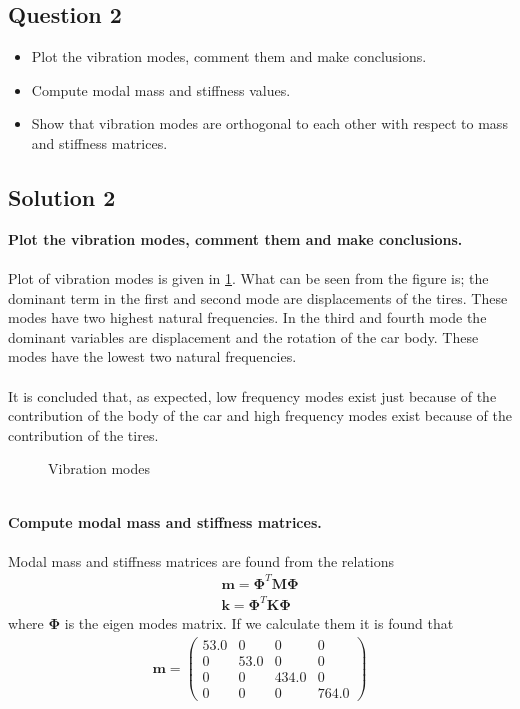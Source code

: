 \documentclass[]{report}
\begin{document}
\subsection*{Question 2}
\begin{itemize}
\item Plot the vibration modes, comment them and make conclusions.
\item Compute modal mass and stiffness values.
\item Show that vibration modes are orthogonal to each other with respect to mass and stiffness matrices.
\end{itemize}
\begin{center}
\subsection*{Solution 2}
\end{center}
\textbf{Plot the vibration modes, comment them and make conclusions.}
\\~\\
Plot of vibration modes is given in \cref{fig:allmodes}. What can be seen from the figure is; the dominant term in the first and second mode are displacements of the tires. These modes have two highest natural frequencies. In the third and fourth mode the dominant variables are displacement and the rotation of the car body. These modes have the lowest two natural frequencies.
\\~\\
It is concluded that, as expected, low frequency modes exist just because of the contribution of the body of the car and high frequency modes exist because of the contribution of the tires.
\begin{figure}[h!]
\centering

\caption{Vibration modes}
\label{fig:allmodes}
\end{figure}
\newpage
~\\
\textbf{Compute modal mass and stiffness matrices.}
\\~\\
Modal mass and stiffness matrices are found from the relations
\begin{eqnarray*}
\mathbf{m}=\mathbf{\Phi}^T \mathbf{M} \mathbf{\Phi} \\
\mathbf{k}=\mathbf{\Phi}^T \mathbf{K} \mathbf{\Phi}
\end{eqnarray*}
where $\mathbf{\Phi}$ is the eigen modes matrix. If we calculate them it is found that
\begin{eqnarray*}
\mathbf{m}=\left(\begin{array}{cccc} 53.0 & 0 & 0 & 0\\ 0 & 53.0 & 0 & 0\\ 0 & 0 & 434.0 & 0\\ 0 & 0 & 0 & 764.0 \end{array}\right)
\end{eqnarray*}
\end{document}
